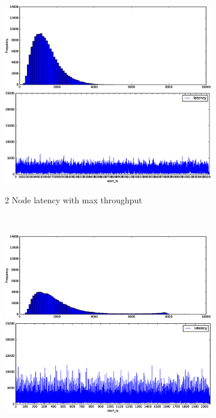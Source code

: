 \begin{figure}
    \centering
    \begin{subfigure}[b]{0.3\textwidth}
        \includegraphics[width=\textwidth]{eps/storm_agg_2node_th_max_hist}
         \includegraphics[width=\textwidth]{eps/storm_agg_2node_th_max_ts}

        \caption{2 Node latency with max throughput}
    \end{subfigure}
    ~ 
    \begin{subfigure}[b]{0.3\textwidth}
        \includegraphics[width=\textwidth]{eps/storm_agg_4node_th_max_hist}
         \includegraphics[width=\textwidth]{eps/storm_agg_4node_th_max_ts}


\end{subfigure}
\end{figure}
